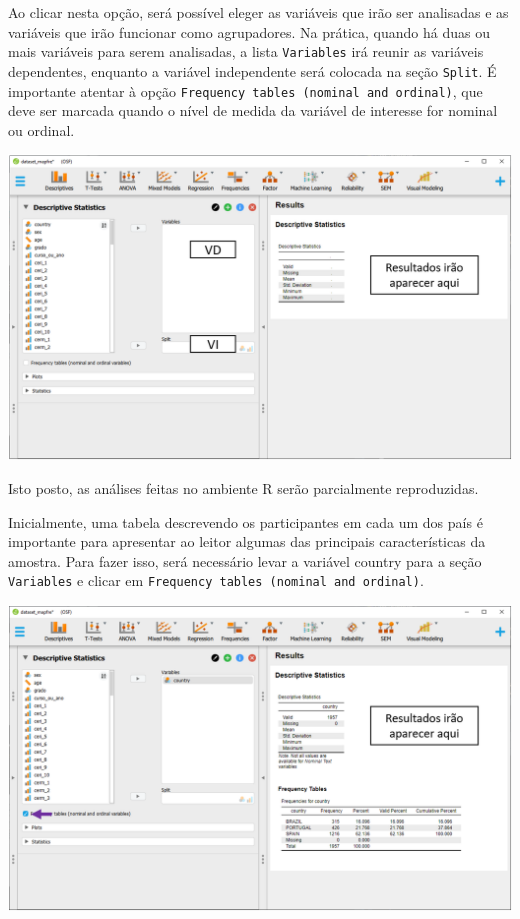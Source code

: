 \documentclass[
]{book}
\begin{document}
Ao clicar nesta opção, será possível eleger as variáveis que irão ser analisadas e as variáveis que irão funcionar como agrupadores. Na prática, quando há duas ou mais variáveis para serem analisadas, a lista \texttt{Variables} irá reunir as variáveis dependentes, enquanto a variável independente será colocada na seção \texttt{Split}. É importante atentar à opção \texttt{Frequency\ tables\ (nominal\ and\ ordinal)}, que deve ser marcada quando o nível de medida da variável de interesse for nominal ou ordinal.

\includegraphics{./img/cap_desc_jasp_descritivo2.png}

Isto posto, as análises feitas no ambiente R serão parcialmente reproduzidas.

Inicialmente, uma tabela descrevendo os participantes em cada um dos país é importante para apresentar ao leitor algumas das principais características da amostra. Para fazer isso, será necessário levar a variável country para a seção \texttt{Variables} e clicar em \texttt{Frequency\ tables\ (nominal\ and\ ordinal)}.

\includegraphics{./img/cap_desc_jasp_proporcao.png}
\end{document}
